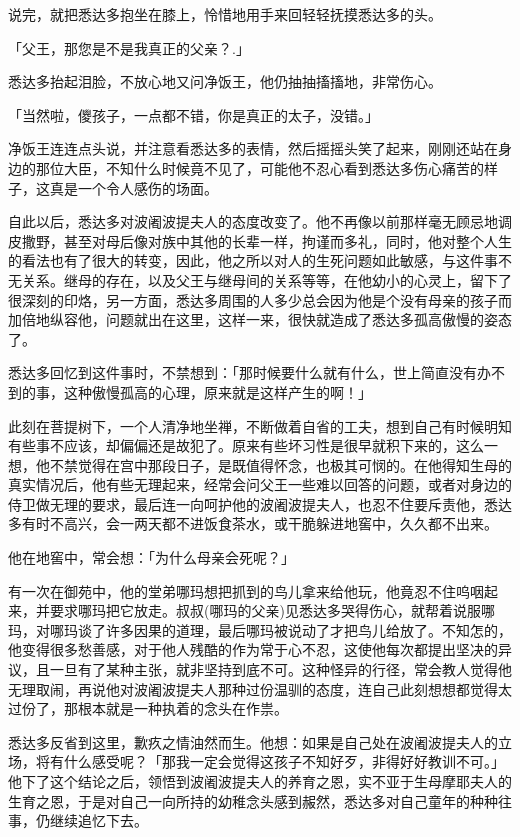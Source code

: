 \documentclass[12pt,twoside,openany]{book}
\begin{document}
说完，就把悉达多抱坐在膝上，怜惜地用手来回轻轻抚摸悉达多的头。

「父王，那您是不是我真正的父亲？.」

悉达多抬起泪脸，不放心地又问净饭王，他仍抽抽搐搐地，非常伤心。

「当然啦，儍孩子，一点都不错，你是真正的太子，没错。」

净饭王连连点头说，并注意看悉达多的表情，然后摇摇头笑了起来，刚刚还站在身边的那位大臣，不知什么时候竟不见了，可能他不忍心看到悉达多伤心痛苦的样子，这真是一个令人感伤的场面。

自此以后，悉达多对波阇波提夫人的态度改变了。他不再像以前那样毫无顾忌地调皮撒野，甚至对母后像对族中其他的长辈一样，拘谨而多礼，同时，他对整个人生的看法也有了很大的转变，因此，他之所以对人的生死问题如此敏感，与这件事不无关系。继母的存在，以及父王与继母间的关系等等，在他幼小的心灵上，留下了很深刻的印烙，另一方面，悉达多周围的人多少总会因为他是个没有母亲的孩子而加倍地纵容他，问题就出在这里，这样一来，很快就造成了悉达多孤高傲慢的姿态了。

悉达多回忆到这件事时，不禁想到：「那时候要什么就有什么，世上简直没有办不到的事，这种傲慢孤高的心理，原来就是这样产生的啊！」

此刻在菩提树下，一个人清净地坐禅，不断做着自省的工夫，想到自己有时候明知有些事不应该，却偏偏还是故犯了。原来有些坏习性是很早就积下来的，这么一想，他不禁觉得在宫中那段日子，是既值得怀念，也极其可悯的。在他得知生母的真实情况后，他有些无理起来，经常会问父王一些难以回答的问题，或者对身边的侍卫做无理的要求，最后连一向呵护他的波阇波提夫人，也忍不住要斥责他，悉达多有时不高兴，会一两天都不进饭食茶水，或干脆躲进地窖中，久久都不出来。

他在地窖中，常会想：「为什么母亲会死呢？」

有一次在御苑中，他的堂弟哪玛想把抓到的鸟儿拿来给他玩，他竟忍不住呜咽起来，并要求哪玛把它放走。叔叔(哪玛的父亲)见悉达多哭得伤心，就帮着说服哪玛，对哪玛谈了许多因果的道理，最后哪玛被说动了才把鸟儿给放了。不知怎的，他变得很多愁善感，对于他人残酷的作为常于心不忍，这使他每次都提出坚决的异议，且一旦有了某种主张，就非坚持到底不可。这种怪异的行径，常会教人觉得他无理取闹，再说他对波阇波提夫人那种过份温驯的态度，连自己此刻想想都觉得太过份了，那根本就是一种执着的念头在作祟。

悉达多反省到这里，歉疚之情油然而生。他想：如果是自己处在波阇波提夫人的立场，将有什么感受呢？「那我一定会觉得这孩子不知好歹，非得好好教训不可。」他下了这个结论之后，领悟到波阇波提夫人的养育之恩，实不亚于生母摩耶夫人的生育之恩，于是对自己一向所持的幼稚念头感到赧然，悉达多对自己童年的种种往事，仍继续追忆下去。
\end{document}
